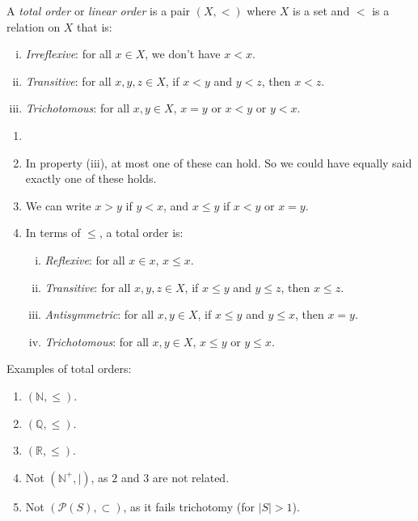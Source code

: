 \documentclass[12pt]{article}
\begin{document}
A \emph{total order} or \emph{linear order} is a pair $(X, <)$ where $X$ is a set and $<$ is a relation on $X$ that is:
\begin{enumerate}[(i)]
	\item \emph{Irreflexive}: for all $x \in X$, we don't have $x < x$.
	\item \emph{Transitive}: for all $x, y, z \in X$, if $x < y$ and $y < z$, then $x < z$.
	\item \emph{Trichotomous}: for all $x, y \in X$, $x = y$ or $x < y$ or $y < x$.
\end{enumerate}

\begin{remark}
	\begin{enumerate}[1.]
		\item[]
		\item In property (iii), at most one of these can hold. So we could have equally said exactly one of these holds.
		\item We can write $x > y$ if $y < x$, and $x \leq y$ if $x < y$ or $x = y$.
		\item In terms of $\leq$, a total order is:
			\begin{enumerate}[(i)']
				\item \emph{Reflexive}: for all $x \in x$, $x \leq x$.
				\item \emph{Transitive}: for all $x, y, z \in X$, if $x \leq y$ and $y \leq z$, then $x \leq z$.
				\item \emph{Antisymmetric}: for all $x, y \in X$, if $x \leq y$ and $y \leq x$, then $x = y$.
				\item \emph{Trichotomous}: for all $x, y \in X$, $x \leq y$ or $y \leq x$.
			\end{enumerate}
	\end{enumerate}
\end{remark}

\begin{exbox}
	Examples of total orders:
	\begin{enumerate}[1.]
		\item $(\mathbb{N}, \leq)$.
		\item $(\mathbb{Q}, \leq)$.
		\item $(\mathbb{R}, \leq)$.
		\item Not $(\mathbb{N}^{+}, \mid)$, as $2$ and $3$ are not related.
		\item Not $(\mathcal{P}(S), \subset)$, as it fails trichotomy (for $|S| > 1$).
	\end{enumerate}
\end{exbox}
\end{document}
